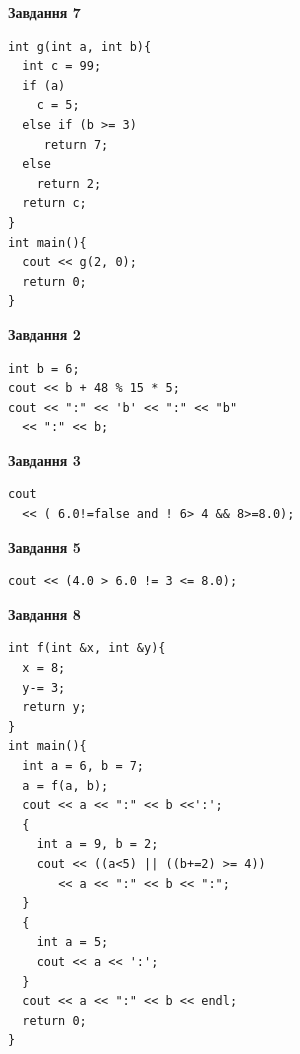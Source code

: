 \documentclass[12pt, ukrainian]{article}
\begin{document}
{\begin {large}
\begin{minipage}[t]{7.0cm}
\begin{center}
\textbf{Завдання 7}
\end{center}
\vspace{-8mm}

\begin{verbatim}
int g(int a, int b){
  int c = 99;
  if (a)
    c = 5;
  else if (b >= 3)
     return 7;
  else
    return 2;
  return c;
}
int main(){
  cout << g(2, 0);
  return 0;
}
\end{verbatim}

\end{minipage}
\vline \hspace{1mm}
\begin{minipage}[t]{11.0cm}

\begin{center}
\textbf{Завдання 2}
\end{center}
\vspace{-8mm}

\begin{verbatim}
int b = 6;
cout << b + 48 % 15 * 5;
cout << ":" << 'b' << ":" << "b" 
  << ":" << b;
\end{verbatim}



\begin{center}
\textbf{Завдання 3}
\end{center}
\vspace{-8mm}

\begin{verbatim}
cout 
  << ( 6.0!=false and ! 6> 4 && 8>=8.0);
\end{verbatim}



\begin{center}
\textbf{Завдання 5}
\end{center}
\vspace{-8mm}

\begin{verbatim}
cout << (4.0 > 6.0 != 3 <= 8.0);
\end{verbatim}



\begin{center}
\textbf{Завдання 8}
\end{center}
\vspace{-8mm}

\begin{verbatim}
int f(int &x, int &y){
  x = 8;
  y-= 3;
  return y;
}
int main(){
  int a = 6, b = 7;
  a = f(a, b);
  cout << a << ":" << b <<':';
  {
    int a = 9, b = 2;
    cout << ((a<5) || ((b+=2) >= 4))
       << a << ":" << b << ":";
  }
  {
    int a = 5;
    cout << a << ':';
  }
  cout << a << ":" << b << endl;
  return 0;
}
\end{verbatim}


\end{minipage}
\end{large}}
\end{document}
